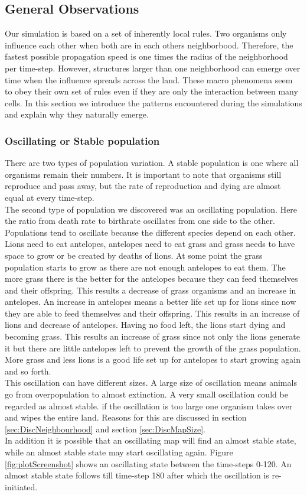 \documentclass[11pt]{article}
\begin{document}
\subsection{General Observations}
Our simulation is based on a set of inherently local rules. Two organisms only influence each other when both are in each others neighborbood. Therefore, the fastest possible propagation speed is one times the radius of the neighborhood per time-step. However, structures larger than one neighborhood can emerge over time when the influence spreads across the land. These macro phenomena seem to obey their own set of rules even if they are only the interaction between many cells. 
In this section we introduce the patterns encountered during the simulations and explain why they naturally emerge.

\subsubsection{Oscillating or Stable population}
There are two types of population variation. A stable population is one where all organisms remain their numbers. It is important to note that organisms still reproduce and pass away, but the rate of reproduction and dying are almost equal at every time-step.\\
The second type of population we discovered was an oscillating population. Here the ratio from death rate to birthrate oscillates from one side to the other. Populations tend to oscillate because the different species depend on each other. Lions need to eat antelopes, antelopes need to eat grass and grass needs to have space to grow or be created by deaths of lions. At some point the grass population starts to grow as there are not enough antelopes to eat them. The more grass there is the better for the antelopes because they can feed themselves and their offspring. This results a decrease of grass organisms and an increase in antelopes. An increase in antelopes means a better life set up for lions since now they are able to feed themselves and their offspring. This results in an increase of lions and decrease of antelopes. Having no food left, the lions start dying and becoming grass. This results an increase of grass since not only the lions generate it but there are little antelopes left to prevent the growth of the grass population. More grass and less lions is a good life set up for antelopes to start growing again and so forth.\\
This oscillation can have different sizes. A large size of oscillation means animals go from overpopulation to almost extinction. A very small oscillation could be regarded as almost stable. if the oscillation is too large one organism takes over and wipes the entire land. Reasons for this are discussed in section \ref{sec:DiscNeighbourhood} and section \ref{sec:DiscMapSize}.\\
In addition it is possible that an oscillating map will find an almost stable state, while an almost stable state may start oscillating again. Figure \ref{fig:plotScreenshot} shows an oscillating state between the time-steps 0-120. An almost stable state follows till time-step 180 after which the oscillation is re-initiated. 
\end{document}
